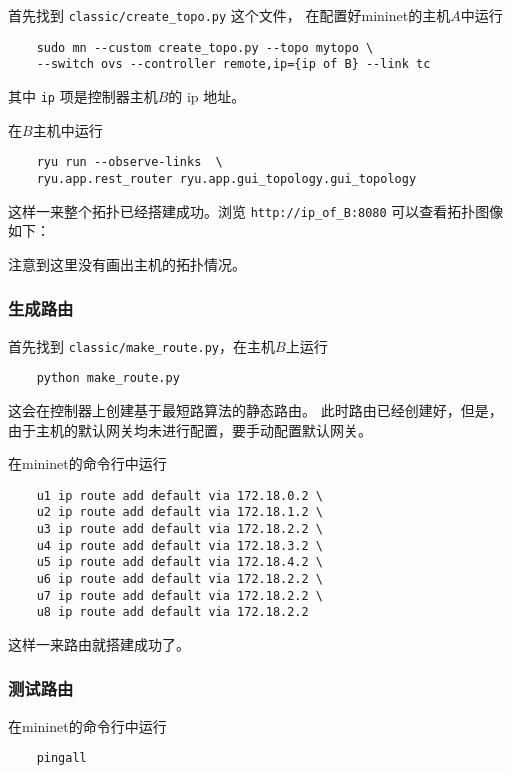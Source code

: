 首先找到 \texttt{classic/create\_{}topo.py} 这个文件，
在配置好mininet的主机$A$中运行
\begin{lstlisting}
	sudo mn --custom create_topo.py --topo mytopo \
	--switch ovs --controller remote,ip={ip of B} --link tc
\end{lstlisting}

其中 \texttt{ip} 项是控制器主机$B$的 ip 地址。

在$B$主机中运行

\begin{lstlisting}
	ryu run --observe-links  \
	ryu.app.rest_router ryu.app.gui_topology.gui_topology
\end{lstlisting}

这样一来整个拓扑已经搭建成功。浏览 \texttt{http://ip\_of\_B:8080} 可以查看拓扑图像如下：



注意到这里没有画出主机的拓扑情况。

\subsubsection{生成路由}

首先找到 \texttt{classic/make\_route.py}，在主机$B$上运行

\begin{lstlisting}
	python make_route.py
\end{lstlisting}

这会在控制器上创建基于最短路算法的静态路由。
此时路由已经创建好，但是，由于主机的默认网关均未进行配置，要手动配置默认网关。

在mininet的命令行中运行

\begin{lstlisting}
	u1 ip route add default via 172.18.0.2 \
	u2 ip route add default via 172.18.1.2 \
	u3 ip route add default via 172.18.2.2 \
	u4 ip route add default via 172.18.3.2 \
	u5 ip route add default via 172.18.4.2 \
	u6 ip route add default via 172.18.2.2 \
	u7 ip route add default via 172.18.2.2 \
	u8 ip route add default via 172.18.2.2
\end{lstlisting}

这样一来路由就搭建成功了。

\subsubsection{测试路由}

在mininet的命令行中运行

\begin{lstlisting}
	pingall
\end{lstlisting}


